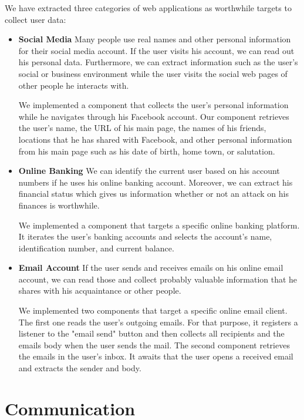 	We have extracted three categories of web applications as worthwhile targets to collect user data:
	\begin{itemize}
		\item \textbf{Social Media} Many people use real names and other personal information for their social media account. If the user visits his account, we can read out his personal data. Furthermore, we can extract information such as the user's social or business environment while the user visits the social web pages of other people he interacts with. 
		
		We implemented a component that collects the user's personal information while he navigates through his Facebook account. Our component retrieves the user's name, the URL of his main page, the names of his friends, locations that he has shared with Facebook, and other personal information from his main page such as his date of birth, home town, or salutation.
		
		\item \textbf{Online Banking} We can identify the current user based on his account numbers if he uses his online banking account. Moreover, we can extract his financial status which gives us information whether or not an attack on his finances is worthwhile.
		
		We implemented a component that targets a specific online banking platform. It iterates the user's banking accounts and selects the account's name, identification number, and current balance.
		
		\item \textbf{Email Account} If the user sends and receives emails on his online email account, we can read those and collect probably valuable information that he shares with his acquaintance or other people.
		
		We implemented two components that target a specific online email client. The first one reads the user's outgoing emails. For that purpose, it registers a listener to the "email send" button and then collects all recipients and the emails body when the user sends the mail. The second component retrieves the emails in the user's inbox. It awaits that the user opens a received email and extracts the sender and body.
	\end{itemize}
	
\clearpage
\section{Communication}
\label{sec:communication}

